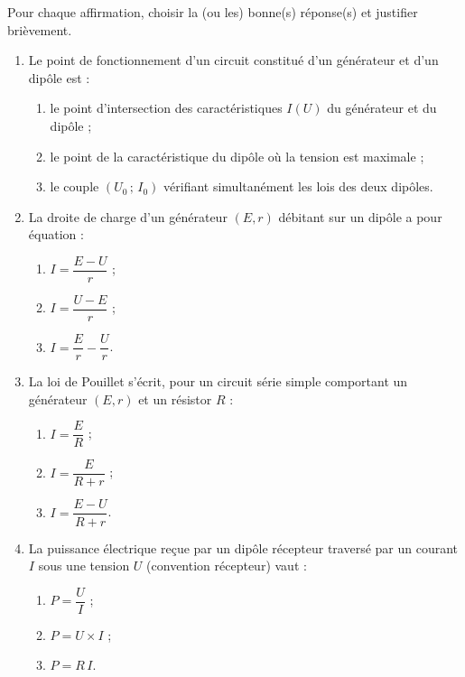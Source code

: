 \documentclass[11pt]{article}
\begin{document}
\begin{exercice}
Pour chaque affirmation, choisir la (ou les) bonne(s) réponse(s) et justifier brièvement.
\begin{enumerate}
\item Le point de fonctionnement d'un circuit constitué d'un générateur et d'un dipôle est :
\begin{enumerate}
\item le point d'intersection des caractéristiques $I(U)$ du générateur et du dipôle ;
\item le point de la caractéristique du dipôle où la tension est maximale ;
\item le couple $(U_0\,;\,I_0)$ vérifiant simultanément les lois des deux dipôles.
\end{enumerate}
\item La droite de charge d'un générateur $(E, r)$ débitant sur un dipôle a pour équation :
\begin{enumerate}
\item $I = \dfrac{E - U}{r}$ ;
\item $I = \dfrac{U - E}{r}$ ;
\item $I = \dfrac{E}{r} - \dfrac{U}{r}$.
\end{enumerate}
\item La loi de Pouillet s'écrit, pour un circuit série simple comportant un générateur $(E, r)$ et un résistor $R$ :
\begin{enumerate}
\item $I = \dfrac{E}{R}$ ;
\item $I = \dfrac{E}{R + r}$ ;
\item $I = \dfrac{E - U}{R + r}$.
\end{enumerate}
\item La puissance électrique reçue par un dipôle récepteur traversé par un courant $I$ sous une tension $U$ (convention récepteur) vaut :
\begin{enumerate}
\item $P = \dfrac{U}{I}$ ;
\item $P = U \times I$ ;
\item $P = R\,I$.
\end{enumerate}
\end{enumerate}
\end{exercice}
\end{document}
